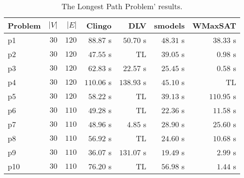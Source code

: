 \documentclass[]{article}
\begin{document}
\begin{table}[h]
\caption{The Longest Path Problem' results.}
\label{tab:longest_path_results}
\vspace{1em}
\scriptsize
\centering
\begin{tabular}{lrrrrrr}
\toprule
Problem & $ |V| $ & $ |E| $ & Clingo & DLV & smodels & WMaxSAT \\
\midrule
p1 & $ 30 $ & $ 120 $ & $ 88.87 $ s & $ 50.70 $ s & $ 48.31 $ s & $ \mathbf{38.33} $ s \\
p2 & $ 30 $ & $ 120 $ & $ 47.55 $ s & TL & $ 39.05 $ s & $ \mathbf{0.98} $ s \\
p3 & $ 30 $ & $ 120 $ & $ 62.83 $ s & $ 22.57 $ s & $ 25.45 $ s & $ \mathbf{0.58} $ s \\
p4 & $ 30 $ & $ 120 $ & $ 110.06 $ s & $ 138.93 $ s & $ \mathbf{45.10} $ s & TL \\
p5 & $ 30 $ & $ 120 $ & $ 58.22 $ s & TL & $ \mathbf{39.13} $ s & $ 110.95 $ s \\
p6 & $ 30 $ & $ 110 $ & $ 49.28 $ s & TL & $ 22.36 $ s & $ \mathbf{11.58} $ s \\
p7 & $ 30 $ & $ 110 $ & $ 48.96 $ s & $ \mathbf{4.85} $ s & $ 28.90 $ s & $ 25.60 $ s \\
p8 & $ 30 $ & $ 110 $ & $ 56.92 $ s & TL & $ 24.60 $ s & $ \mathbf{10.68} $ s \\
p9 & $ 30 $ & $ 110 $ & $ 36.07 $ s & $ 131.07 $ s & $ 19.49 $ s & $ \mathbf{2.99} $ s \\
p10 & $ 30 $ & $ 110 $ & $ 76.20 $ s & TL & $ 56.98 $ s & $ \mathbf{1.44} $ s \\
\bottomrule
\end{tabular}
\end{table}
\end{document}

